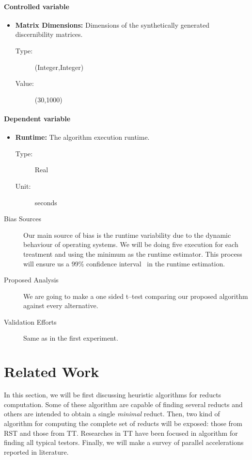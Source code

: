 \documentclass[11pt]{article}   %
\begin{document}
    \paragraph{Controlled variable}  
  	\begin{itemize}
  	   \item \textbf{Matrix Dimensions:} Dimensions of the synthetically generated discernibility matrices.
  	   		\begin{description}
  	   			\item[Type:] (Integer,Integer)
  	   			\item[Value:] (30,1000)
  	   		\end{description}
    \end{itemize}
    \paragraph{Dependent variable}  
  	\begin{itemize}
  	   \item \textbf{Runtime:} The algorithm execution runtime.
  	   		\begin{description}
  	   			\item[Type:] Real
  	   			\item[Unit:] seconds
  	   		\end{description}
    \end{itemize}
    \begin{description}
    \item[Bias Sources] Our main source of bias is the runtime variability due to the dynamic behaviour of
    					   	operating systems. We will be doing five execution for each treatment and using 
    					   	the minimum as the runtime estimator. This process will ensure us a 99\% confidence
    					   	interval~\cite{Haveraaen01} in the runtime estimation.			   	
    	\item[Proposed Analysis] We are going to make a one sided t--test comparing our proposed algorithm against
    							every alternative.
    	\item[Validation Efforts] Same as in the first experiment.
  \end{description}
  
\section{Related Work}\label{relatedWork}
  In this section, we will be first discussing heuristic algorithms for reducts computation. Some of these 
  algorithm are capable of finding several reducts and others are intended to obtain a single \textit{minimal} 
  reduct. Then, two kind of algorithm for computing the complete set of reducts will be exposed: those 
  from RST and those from TT. Researches in TT have been focused in algorithm for finding all typical testors.
  Finally, we will make a survey of parallel accelerations reported in literature.  
  
\end{document}
